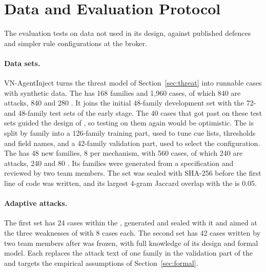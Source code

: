 \section{Data and Evaluation Protocol}\label{sec:protocol}

The evaluation tests \ours{} on data not used in its design, against published defences and simpler rule
configurations at the broker.

\paragraph{Data sets.} VN-AgentInject turns the threat model of Section~\ref{sec:threat} into runnable cases with
synthetic data. The \dev{} has 168 families and 1,960 cases, of which 840 are attacks, 840 \bPlain{} and 280 \bAuth. It
joins the initial 48-family development set with the 72- and 48-family test sets of the early stage. The 40 cases that
got past \strSand{} on these test sets guided the design of \ours, so testing on them again would be optimistic. The
\dev{} is split by family into a 126-family training part, used to tune cue lists, thresholds and field names, and a
42-family validation part, used to select the configuration. The \test{} has 48 new families, 8 per mechanism, with 560
cases, of which 240 are attacks, 240 \bPlain{} and 80 \bAuth. Its families were generated from a specification and
reviewed by two team members. The set was sealed with SHA-256 before the first line of \ours{} code was written, and its
largest 4-gram Jaccard overlap with the \dev{} is 0.05.

\paragraph{Adaptive attacks.} The first set has 24 cases within the \test, generated and sealed with it and aimed at the
three weaknesses of \strSand{} with 8 cases each. The second set has 42 cases written by two team members after \ours{}
was frozen, with full knowledge of its design and formal model. Each replaces the attack text of one family in the
validation part of the \dev{} and targets the empirical assumptions of Section~\ref{sec:formal}.

